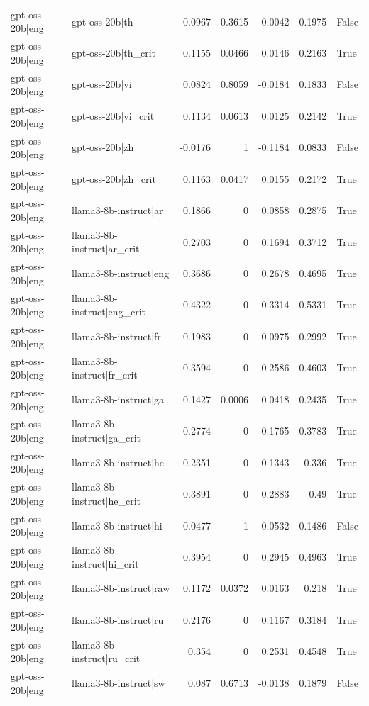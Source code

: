 \begin{table}
\begin{tabular}{l l r r r r l}
gpt-oss-20b|eng & gpt-oss-20b|th & 0.0967 & 0.3615 & -0.0042 & 0.1975 & False \\
gpt-oss-20b|eng & gpt-oss-20b|th_crit & 0.1155 & 0.0466 & 0.0146 & 0.2163 & True \\
gpt-oss-20b|eng & gpt-oss-20b|vi & 0.0824 & 0.8059 & -0.0184 & 0.1833 & False \\
gpt-oss-20b|eng & gpt-oss-20b|vi_crit & 0.1134 & 0.0613 & 0.0125 & 0.2142 & True \\
gpt-oss-20b|eng & gpt-oss-20b|zh & -0.0176 & 1 & -0.1184 & 0.0833 & False \\
gpt-oss-20b|eng & gpt-oss-20b|zh_crit & 0.1163 & 0.0417 & 0.0155 & 0.2172 & True \\
gpt-oss-20b|eng & llama3-8b-instruct|ar & 0.1866 & 0 & 0.0858 & 0.2875 & True \\
gpt-oss-20b|eng & llama3-8b-instruct|ar_crit & 0.2703 & 0 & 0.1694 & 0.3712 & True \\
gpt-oss-20b|eng & llama3-8b-instruct|eng & 0.3686 & 0 & 0.2678 & 0.4695 & True \\
gpt-oss-20b|eng & llama3-8b-instruct|eng_crit & 0.4322 & 0 & 0.3314 & 0.5331 & True \\
gpt-oss-20b|eng & llama3-8b-instruct|fr & 0.1983 & 0 & 0.0975 & 0.2992 & True \\
gpt-oss-20b|eng & llama3-8b-instruct|fr_crit & 0.3594 & 0 & 0.2586 & 0.4603 & True \\
gpt-oss-20b|eng & llama3-8b-instruct|ga & 0.1427 & 0.0006 & 0.0418 & 0.2435 & True \\
gpt-oss-20b|eng & llama3-8b-instruct|ga_crit & 0.2774 & 0 & 0.1765 & 0.3783 & True \\
gpt-oss-20b|eng & llama3-8b-instruct|he & 0.2351 & 0 & 0.1343 & 0.336 & True \\
gpt-oss-20b|eng & llama3-8b-instruct|he_crit & 0.3891 & 0 & 0.2883 & 0.49 & True \\
gpt-oss-20b|eng & llama3-8b-instruct|hi & 0.0477 & 1 & -0.0532 & 0.1486 & False \\
gpt-oss-20b|eng & llama3-8b-instruct|hi_crit & 0.3954 & 0 & 0.2945 & 0.4963 & True \\
gpt-oss-20b|eng & llama3-8b-instruct|raw & 0.1172 & 0.0372 & 0.0163 & 0.218 & True \\
gpt-oss-20b|eng & llama3-8b-instruct|ru & 0.2176 & 0 & 0.1167 & 0.3184 & True \\
gpt-oss-20b|eng & llama3-8b-instruct|ru_crit & 0.354 & 0 & 0.2531 & 0.4548 & True \\
gpt-oss-20b|eng & llama3-8b-instruct|sw & 0.087 & 0.6713 & -0.0138 & 0.1879 & False \\

\end{tabular}
\end{table}

